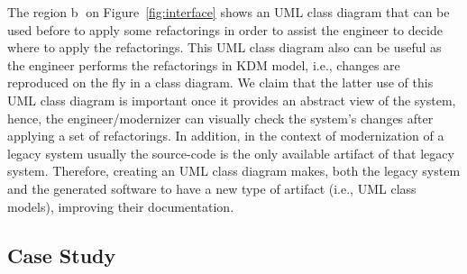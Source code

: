 \documentclass[12pt]{article}
\begin{document}
The region \textcircled{b} on Figure~\ref{fig:interface} shows an UML class diagram that can be used before to apply some refactorings in order to assist the engineer to decide where to apply the refactorings. This UML class diagram also can be useful as the engineer performs the refactorings in KDM model, i.e., changes are reproduced on the fly in a class diagram.
We claim that the latter use of this UML class diagram is important once it provides an abstract view of the system, hence, the engineer/modernizer can visually check the system's changes after applying a set of refactorings. 
In addition, in the context of modernization of a legacy system usually the source-code is the only available artifact of that legacy system. 
Therefore, creating an UML class diagram makes, both the legacy system and the generated software to have a new type of artifact (i.e., UML class models), improving their documentation.


\subsection{Case Study}
\end{document}
